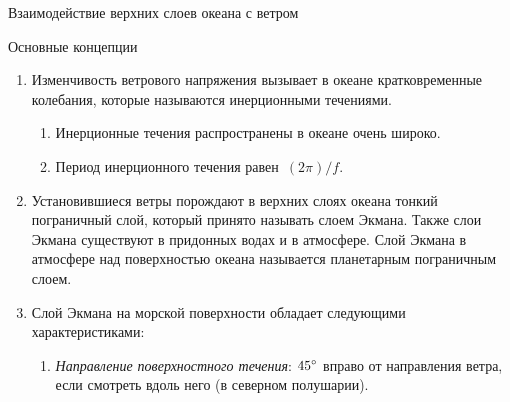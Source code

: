 \begin{chapter}{Взаимодействие верхних слоев океана с ветром}
\begin{section}{Основные концепции}
\begin{enumerate}
\item
Изменчивость ветрового напряжения%
вызывает в океане кратковременные колебания, которые называются инерционными
течениями.
%
%
\begin{enumerate}
\item 
Инерционные течения распространены в океане очень широко.
%

\item 
Период инерционного течения равен~$(2 \pi)/f$.
%
\end{enumerate}

\item Установившиеся ветры порождают в верхних слоях океана тонкий пограничный
слой, который принято называть слоем Экмана. Также слои Экмана существуют
в придонных водах и в атмосфере. Слой Экмана в атмосфере над поверхностью
океана называется планетарным пограничным слоем.
%

\item 
Слой Экмана на морской поверхности
обладает следующими характеристиками:
%
%
\begin{enumerate}
\item 
\textit{Направление поверхностного течения}: ${45}^\circ$ вправо 
от направления ветра, если смотреть вдоль него (в северном полушарии). 
%


\end{enumerate}
\end{enumerate}
\end{section}
\end{chapter}
